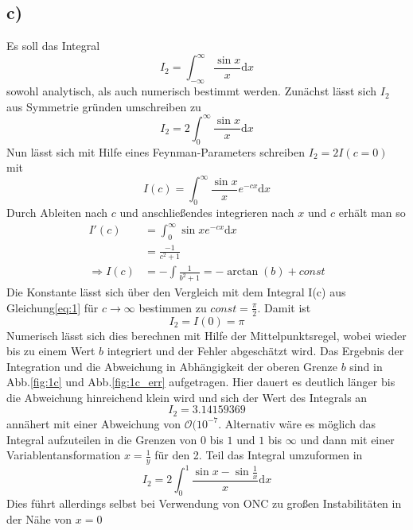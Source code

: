 \subsection*{c)}
Es soll das Integral 
\[
I_2 = \int_{-\infty}^{\infty}\frac{\sin{x}}{x}\mathrm{d}x
\]
sowohl analytisch, als auch numerisch bestimmt werden.
Zunächst lässt sich $I_2$ aus Symmetrie gründen umschreiben zu
\[
I_2 = 2\int_{0}^{\infty}\frac{\sin{x}}{x}\mathrm{d}x
\]
Nun lässt sich mit Hilfe eines Feynman-Parameters schreiben $I_2 = 2I(c=0)$ mit
\begin{equation}
I(c) = \int_0^{\infty} \frac{\sin{x}}{x}e^{-cx}\mathrm{d}x\label{eq:1}
\end{equation}
Durch Ableiten nach $c$ und anschließendes integrieren nach $x$ und $c$ erhält man so
\begin{align*}
I'(c) &= \int_0^{\infty} \sin{x}e^{-cx} \mathrm{d}x\\
&= \frac{-1}{c^2+1}\\
\Rightarrow I(c) &= -\int \frac{1}{b^2+1} = -\arctan(b) + const
\end{align*}
Die Konstante lässt sich über den Vergleich mit dem Integral I(c) aus Gleichung\eqref{eq:1} für $c\rightarrow \infty$ bestimmen zu $const = \frac{\pi}{2}$.
Damit ist
\[
I_2 = I(0) = \pi
\]
Numerisch lässt sich dies berechnen mit Hilfe der Mittelpunktsregel, wobei wieder bis zu einem Wert $b$ integriert und der Fehler abgeschätzt wird.
Das Ergebnis der Integration und die Abweichung in Abhängigkeit der oberen Grenze $b$ sind in Abb.\ref{fig:1c} und Abb.\ref{fig:1c_err} aufgetragen.
Hier dauert es deutlich länger bis die Abweichung hinreichend klein wird und sich der Wert des Integrals an
\[
I_2 = 3.14159369\]
annähert mit einer Abweichung von $\mathcal{O}(10^{-7}$.
Alternativ wäre es möglich das Integral aufzuteilen in die Grenzen von $0$ bis $1$ und $1$ bis $\infty$ und dann mit einer Variablentansformation $x = \frac{1}{y}$ für den 2. Teil das Integral umzuformen in
\[
I_2 = 2\int_{0}^{1}\frac{\sin{x}-\sin{\frac{1}{x}}}{x}\mathrm{d}x
\]
Dies führt allerdings selbst bei Verwendung von ONC zu großen Instabilitäten in der Nähe von $x=0$
